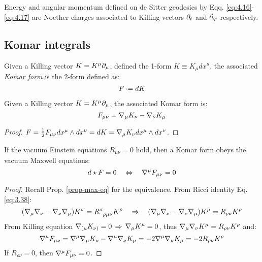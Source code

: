 \begin{example}
  Energy and angular momentum defined on de Sitter geodesics by Eqq. \ref{eq:4.16}-\ref{eq:4.17} are Noether charges associated to Killing vectors $ \partial_t $ and $ \partial_\varphi $ respectively.
\end{example}

\subsection{Komar integrals}

\begin{definition}
  Given a Killing vector $ K = K^\mu \partial_\mu $, defined the 1-form $ K \equiv K_\mu dx^\mu $, the associated \textit{Komar form} is the 2-form defined as:
  \begin{equation}
    F \defeq dK
    \label{eq:4.30}
  \end{equation}
\end{definition}

\begin{proposition}
  Given a Killing vector $ K = K^\mu \partial_\mu $, the associated Komar form is:
  \begin{equation}
    F_{\mu \nu} = \nabla_\mu K_\nu - \nabla_\nu K_\mu
    \label{eq:4.31}
  \end{equation}
\end{proposition}
\begin{proof}
  $ F = \frac{1}{2} F_{\mu \nu} dx^\mu \wedge dx^\nu = dK = \nabla_\mu K_\nu dx^\mu \wedge dx^\nu $.
\end{proof}

\begin{theorem}
  If the vacuum Einstein equations $ R_{\mu \nu} = 0 $ hold, then a Komar form obeys the vacuum Maxwell equations:
  \begin{equation}
    d \star F = 0
    \quad \Leftrightarrow \quad
    \nabla^\mu F_{\mu \nu} = 0
    \label{eq:4.32}
  \end{equation}
\end{theorem}
\begin{proof}
  Recall Prop. \ref{prop-max-eq} for the equivalence. From Ricci identity Eq. \ref{eq:3.38}:
  \begin{equation*}
    (\na_\mu \na_\nu - \na_\nu \na_\mu) K^\sigma = \tensor{R}{^\sigma_{\rho \mu \nu}} K^\rho
    \quad \Rightarrow \quad
    (\na_\mu \na_\nu - \na_\nu \na_\mu) K^\mu = R_{\rho \nu} K^\rho
  \end{equation*}
  From Killing equation $ \nabla_{(\mu} K_{\nu)} = 0 \,\Rightarrow\, \nabla_\mu K^\mu = 0 $, thus $ \nabla_\mu \nabla_\nu K^\mu = R_{\rho \nu} K^\rho $ and:
  \begin{equation*}
    \nabla^\mu F_{\mu \nu} = \nabla^\mu \nabla_\mu K_\nu - \nabla^\mu \nabla_\nu K_\mu = -2 \nabla^\mu \nabla_\nu K_\mu = -2 R_{\rho \nu} K^\rho
  \end{equation*}
  If $ R_{\rho \nu} = 0 $, then $ \nabla^\mu F_{\mu \nu} = 0 $.
\end{proof}

